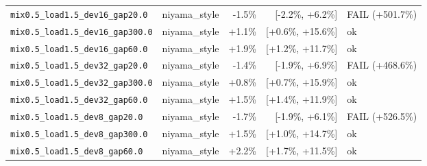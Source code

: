 \begin{longtable}{llrrl}
\texttt{mix0.5\_load1.5\_dev16\_gap20.0} & niyama\_style & -1.5\% & [-2.2\%, +6.2\%] & FAIL (+501.7\%) \\
\texttt{mix0.5\_load1.5\_dev16\_gap300.0} & niyama\_style & +1.1\% & [+0.6\%, +15.6\%] & ok \\
\texttt{mix0.5\_load1.5\_dev16\_gap60.0} & niyama\_style & +1.9\% & [+1.2\%, +11.7\%] & ok \\
\texttt{mix0.5\_load1.5\_dev32\_gap20.0} & niyama\_style & -1.4\% & [-1.9\%, +6.9\%] & FAIL (+468.6\%) \\
\texttt{mix0.5\_load1.5\_dev32\_gap300.0} & niyama\_style & +0.8\% & [+0.7\%, +15.9\%] & ok \\
\texttt{mix0.5\_load1.5\_dev32\_gap60.0} & niyama\_style & +1.5\% & [+1.4\%, +11.9\%] & ok \\
\texttt{mix0.5\_load1.5\_dev8\_gap20.0} & niyama\_style & -1.7\% & [-1.9\%, +6.1\%] & FAIL (+526.5\%) \\
\texttt{mix0.5\_load1.5\_dev8\_gap300.0} & niyama\_style & +1.5\% & [+1.0\%, +14.7\%] & ok \\
\texttt{mix0.5\_load1.5\_dev8\_gap60.0} & niyama\_style & +2.2\% & [+1.7\%, +11.5\%] & ok \\
\bottomrule
\end{longtable}
